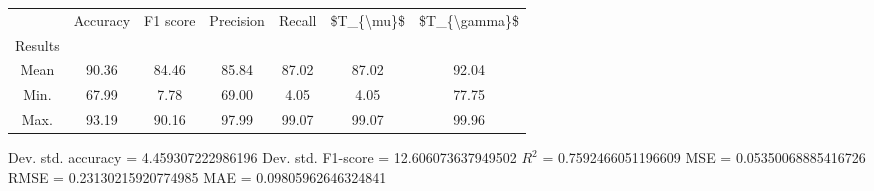 \begin{tabular}{|c|c|c|c|c|c|c|}
\toprule
{} &  Accuracy &  F1 score &  Precision &  Recall &  \$T\_\{\textbackslash mu\}\$ &  \$T\_\{\textbackslash gamma\}\$ \\
Results &           &           &            &         &            &               \\
\hline
Mean    &     90.36 &     84.46 &      85.84 &   87.02 &      87.02 &         92.04 \\
Min.    &     67.99 &      7.78 &      69.00 &    4.05 &       4.05 &         77.75 \\
Max.    &     93.19 &     90.16 &      97.99 &   99.07 &      99.07 &         99.96 \\
\bottomrule
\end{tabular}

 Dev. std. accuracy = 4.459307222986196
 Dev. std. F1-score = 12.606073637949502
 $R^2$ = 0.7592466051196609
 MSE = 0.05350068885416726
 RMSE = 0.23130215920774985
 MAE = 0.09805962646324841